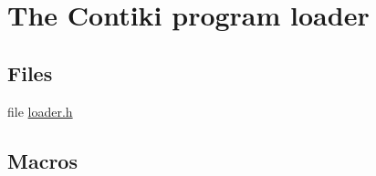 \hypertarget{group__loader}{\section{The Contiki program loader}
\label{group__loader}
}
\subsection*{Files}
\begin{DoxyCompactItemize}
\item 
file \hyperlink{loader_8h}{loader.\-h}
\end{DoxyCompactItemize}
\subsection*{Macros}
